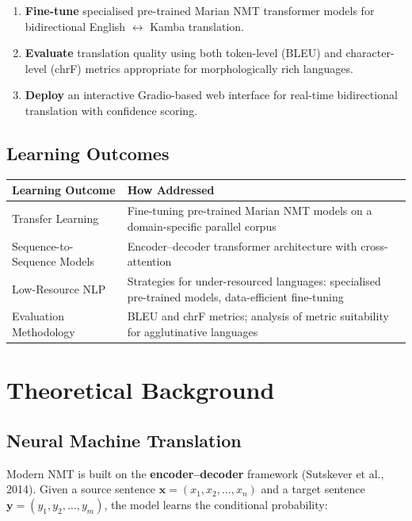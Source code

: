 \documentclass[12pt,a4paper]{article}
\begin{document}
\begin{enumerate}
    \item \textbf{Fine-tune} specialised pre-trained Marian NMT transformer models for bidirectional English $\leftrightarrow$ Kamba translation.
    \item \textbf{Evaluate} translation quality using both token-level (BLEU) and character-level (chrF) metrics appropriate for morphologically rich languages.
    \item \textbf{Deploy} an interactive Gradio-based web interface for real-time bidirectional translation with confidence scoring.
\end{enumerate}

\subsection{Learning Outcomes}

\begin{table}[H]
\centering
\begin{tabular}{@{}p{4.5cm}p{9cm}@{}}
\toprule
\textbf{Learning Outcome} & \textbf{How Addressed} \\
\midrule
Transfer Learning & Fine-tuning pre-trained Marian NMT models on a domain-specific parallel corpus \\
Sequence-to-Sequence Models & Encoder--decoder transformer architecture with cross-attention \\
Low-Resource NLP & Strategies for under-resourced languages: specialised pre-trained models, data-efficient fine-tuning \\
Evaluation Methodology & BLEU and chrF metrics; analysis of metric suitability for agglutinative languages \\
\bottomrule
\end{tabular}
\end{table}

\section{Theoretical Background}

\subsection{Neural Machine Translation}

Modern NMT is built on the \textbf{encoder--decoder} framework (Sutskever et al., 2014). Given a source sentence \(\mathbf{x} = (x_1, x_2, \ldots, x_n)\) and a target sentence \(\mathbf{y} = (y_1, y_2, \ldots, y_m)\), the model learns the conditional probability:
\end{document}
